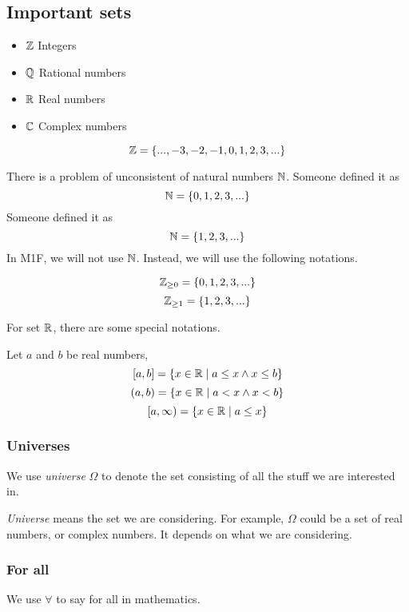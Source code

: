 \documentclass[a4paper]{article}
\begin{document}
\subsection{Important sets}
\begin{eg}\leavevmode
	\begin{itemize}
		\item $\Z$ Integers
		\item $\mathbb{Q}$ Rational numbers
		\item $\mathbb{R}$ Real numbers
		\item $\mathbb{C}$ Complex numbers
	\end{itemize}
\end{eg}

\begin{defi}[Integers $\Z$]
$$\mathbb{Z} = \{ ..., -3, -2, -1, 0, 1, 2, 3, ...\}$$
\end{defi}
There is a problem of unconsistent of natural numbers $\mathbb{N}$. Someone defined it as $$\mathbb{N} = \{ 0, 1, 2, 3, ...\}$$Someone defined it as $$\mathbb{N} = \{ 1, 2, 3, ...\}$$
In M1F, we will not use $\mathbb{N}$. Instead, we will use the following notations.
\begin{notation}
$$\mathbb{Z} _{\geq 0} = \{ 0, 1, 2, 3, ...\}$$
$$\mathbb{Z} _{\geq 1} = \{ 1, 2, 3, ...\}$$
\end{notation}

For set $\mathbb{R}$, there are some special notations.
\begin{notation}
Let $a$ and $b$ be real numbers,
$$[a,b] = \{x \in \mathbb{R} \mid a \leq x \land x \leq b\}$$
$$(a,b) = \{x \in \mathbb{R} \mid a < x \land x < b\}$$
$$[a,\infty) = \{x \in \mathbb{R} \mid a \leq x\}$$
\end{notation}

\subsubsection{Universes}
\begin{notation}
We use \emph{universe} $\Omega$ to denote the set consisting of all the stuff we are interested in.
\end{notation}
\emph{Universe} means the set we are considering. For example, $\Omega$ could be a set of real numbers, or complex numbers. It depends on what we are considering.

\subsubsection{For all}
\begin{notation}
We use $\forall$ to say for all in mathematics.
\end{notation}
\end{document}
